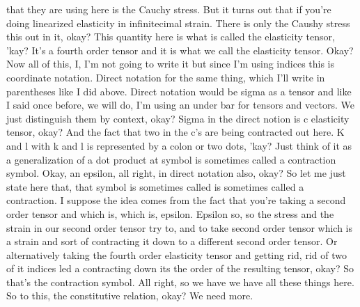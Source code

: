 \documentclass[10pt]{article}
\begin{document}
that they are using here is the Cauchy stress. But it turns out that if you're doing linearized elasticity in infinitecimal strain. There is only the Caushy stress this out in it, okay? This quantity here is what is called the elasticity tensor, 'kay? It's a fourth order tensor and it is what we call the elasticity tensor. Okay? Now all of this, I, I'm not going to write it but since I'm using indices this is coordinate notation. Direct notation for the same thing, which I'll write in parentheses like I did above. Direct notation would be sigma as a tensor and like I said once before, we will do, I'm using an under bar for tensors and vectors. We just distinguish them by context, okay? Sigma in the direct notion is c elasticity tensor, okay? And the fact that two in the c's are being contracted out here. K and l with k and l is represented by a colon or two dots, 'kay? Just think of it as a generalization of a dot product at symbol is sometimes called a contraction symbol. Okay, an epsilon, all right, in direct notation also, okay? So let me just state here that, that symbol is sometimes called is sometimes called a contraction. I suppose the idea comes from the fact that you're taking a second order tensor and which is, which is, epsilon. Epsilon so, so the stress and the strain in our second order tensor try to, and to take second order tensor which is a strain and sort of contracting it down to a different second order tensor. Or alternatively taking the fourth order elasticity tensor and getting rid, rid of two of it indices led a contracting down its the order of the resulting tensor, okay? So that's the contraction symbol. All right, so we have we have all these things here. So to this, the constitutive relation, okay? We need more.
\end{document}
